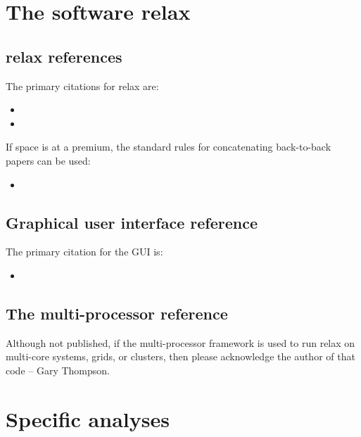 
\section*{The software relax}



\subsection*{relax references}

The primary citations for relax are:
\begin{itemize}
  \item {}
  \item {}
\end{itemize}

If space is at a premium, the standard rules for concatenating back-to-back papers can be used:
\begin{itemize}
  \item {}
\end{itemize}



\subsection*{Graphical user interface reference}

The primary citation for the GUI is:
\begin{itemize}
  \item {}
\end{itemize}



\subsection*{The multi-processor reference}

Although not published, if the multi-processor framework is used to run relax on multi-core systems, grids, or clusters, then please acknowledge the author of that code -- Gary Thompson.




\section*{Specific analyses}

